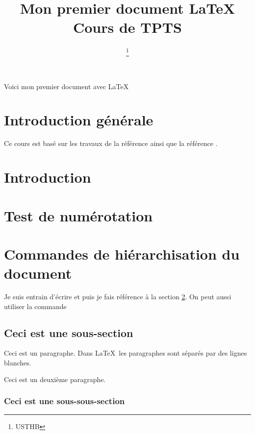 \documentclass[a4paper,11pt]{article}
\title{Mon premier document \LaTeX \\ Cours de TPTS}
\author{\nompropre{J. Messamah} \and \nompropre{Mazri} \thanks{USTHB}}
\date{}
\begin{document}
\maketitle

\tableofcontents

Voici mon premier document avec \LaTeX

\section*{Introduction générale}

Ce cours est basé sur les travaux de la référence \cite{latex-a-document-preparation-system} ainsi que la référence \cite[chapitre 2]{the-latex-companion}.

\section{Introduction}


\section{Test de numérotation}
\label{section/referenceTest}

\section{Commandes de hiérarchisation du document}

Je suis entrain d'écrire et puis je fais référence à la section \ref{section/referenceTest}. On peut aussi utiliser la commande \pageref{section/referenceTest}

\subsection{Ceci est une sous-section}

Ceci est un paragraphe. Dans \LaTeX\ les paragraphes sont séparés par des lignes blanches.

Ceci est un deuxième paragraphe.

\subsubsection{Ceci est une sous-sous-section}
\end{document}
